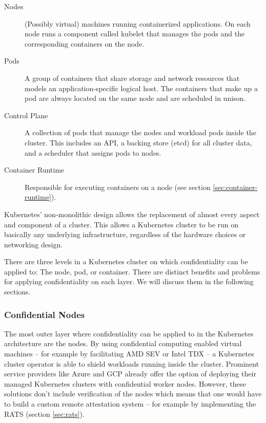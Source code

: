 \begin{description}
  \item[Nodes]
    (Possibly virtual) machines running containerized applications. On each node
    runs a component called kubelet that manages the pods and the corresponding
    containers on the node.
  \item[Pods]
    A group of containers that share storage and network resources that models
    an application-specific logical host. The containers that make up a pod are
    always located on the same node and are scheduled in unison.
  \item[Control Plane]
    A collection of pods that manage the nodes and workload pods inside the
    cluster. This includes an API, a backing store (etcd) for all cluster data,
    and a scheduler that assigns pods to nodes.
  \item[Container Runtime]
    Responsible for executing containers on a node (see section
    \ref{sec:container-runtime}).
\end{description}


Kubernetes' non-monolithic design allows the replacement of almost every aspect
and component of a cluster. This allows a Kubernetes cluster to be run on
basically any underlying infrastructure, regardless of the hardware choices or
networking design.

There are three levels in a Kubernetes cluster on which confidentiality can be
applied to: The node, pod, or container. There are distinct benefits and
problems for applying confidentiality on each layer. We will discuss them in the
following sections.

\subsubsection{Confidential Nodes}

The most outer layer where confidentiality can be applied to in the Kubernetes
architecture are the nodes. By using confidential computing enabled virtual
machines -- for example by facilitating AMD SEV or Intel TDX -- a Kubernetes
cluster operator is able to shield workloads running inside the cluster.
Prominent service providers like Azure and GCP already offer the option of
deploying their managed Kubernetes clusters with confidential worker nodes.
However, these solutions don't include verification of the nodes which means
that one would have to build a custom remote attestation system -- for example
by implementing the RATS (section \ref{sec:rats}).


